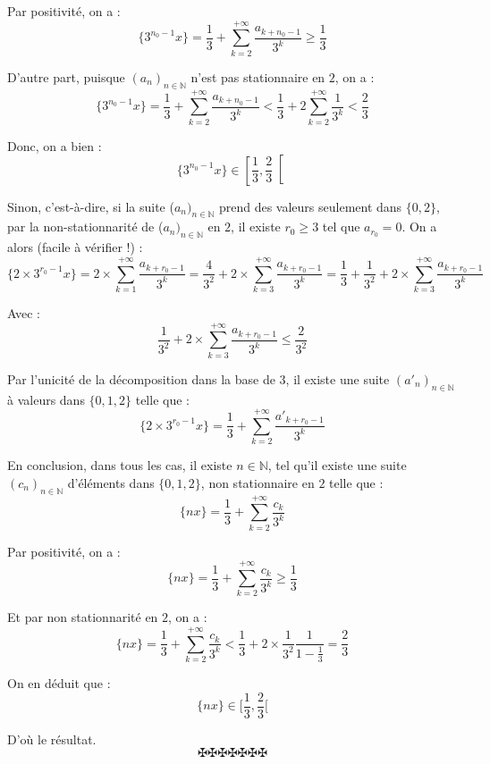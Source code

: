 Par positivit{\'e}, on a :
\[ \{3^{n_0 - 1} x\}= \frac{1}{3} + \sum_{k = 2}^{+ \infty} \frac{a_{k + n_0 -
   1}}{3^k} \geq \frac{1}{3} \]


D'autre part, puisque $(a_n)_{n \in \mathbb{N}}$ n'est pas stationnaire en
$2$, on a :
\[ \{3^{n_0 - 1} x\}= \frac{1}{3} + \sum_{k = 2}^{+ \infty} \frac{a_{k + n_0 -
   1}}{3^k} < \frac{1}{3} + 2 \sum_{k = 2}^{+ \infty} \frac{1}{3^k} <
   \frac{2}{3} \]


Donc, on a bien :
\[ \{3^{n_0 - 1} x\} \in \left[ \frac{1}{3}, \frac{2}{3} \right[ \]


Sinon, c'est-{\`a}-dire, si la suite ($a_n)_{n \in \mathbb{N}}$ prend des
valeurs seulement dans $\{0, 2\}$, par la non-stationnarit{\'e} de ($a_n)_{n
\in \mathbb{N}}$ en $2$, il existe $r_0 \geq 3$ tel que $a_{r_0} = 0$. On a
alors (facile {\`a} v{\'e}rifier !) :
\[ \{2 \times 3^{r_0 - 1} x\}= 2 \times \sum_{k = 1}^{+ \infty} \frac{a_{k +
   r_0 - 1}}{3^k} = \frac{4}{3^2} + 2 \times \sum_{k = 3}^{+ \infty}
   \frac{a_{k + r_0 - 1}}{3^k} = \frac{1}{3} + \frac{1}{3^2} + 2 \times
   \sum_{k = 3}^{+ \infty} \frac{a_{k + r_0 - 1}}{3^k} \]


Avec :
\[ \frac{1}{3^2} + 2 \times \sum_{k = 3}^{+ \infty} \frac{a_{k + r_0 -
   1}}{3^k} \leq \frac{2}{3^2} \]


Par l'unicit{\'e} de la d{\'e}composition dans la base de $3$, il existe une
suite $(a'_n)_{n \in \mathbb{N}}$ {\`a} valeurs dans $\{0, 1, 2\}$ telle que :
\[ \{2 \times 3^{r_0 - 1} x\}= \frac{1}{3} + \sum_{k = 2}^{+ \infty}
   \frac{a'_{k + r_0 - 1}}{3^k} \]


En conclusion, dans tous les cas, il existe $n \in \mathbb{N}$, tel qu'il
existe une suite $(c_n)_{n \in \mathbb{N}}$ d'{\'e}l{\'e}ments dans $\{0, 1,
2\}$, non stationnaire en $2$ telle que :
\[ \{nx\}= \frac{1}{3} + \sum_{k = 2}^{+ \infty} \frac{c_k}{3^k} \]


Par positivit{\'e}, on a :
\[ \{nx\}= \frac{1}{3} + \sum_{k = 2}^{+ \infty} \frac{c_k}{3^k} \geq
   \frac{1}{3} \]


Et par non stationnarit{\'e} en $2$, on a :
\[ \{nx\}= \frac{1}{3} + \sum_{k = 2}^{+ \infty} \frac{c_k}{3^k} < \frac{1}{3}
   + 2 \times \frac{1}{3^2}  \frac{1}{1 - \frac{1}{3}} = \frac{2}{3} \]


On en d{\'e}duit que :
\[ \{nx\} \in [\frac{1}{3}, \frac{2}{3} [ \]


D'o{\`u} le r{\'e}sultat.
\[ \maltese \maltese \maltese \maltese \maltese \maltese \maltese \]

